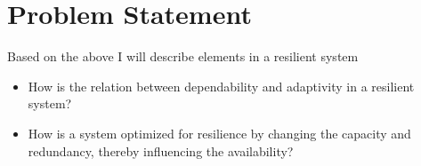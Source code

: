 \section{Problem Statement}
\label{sc:problem_statement}
Based on the above I will describe elements in a resilient system 

\begin{itemize}
\item How is the relation between dependability and adaptivity in a resilient system?
\item How is a system optimized for resilience by changing the capacity and redundancy, thereby influencing the availability?
\end{itemize}